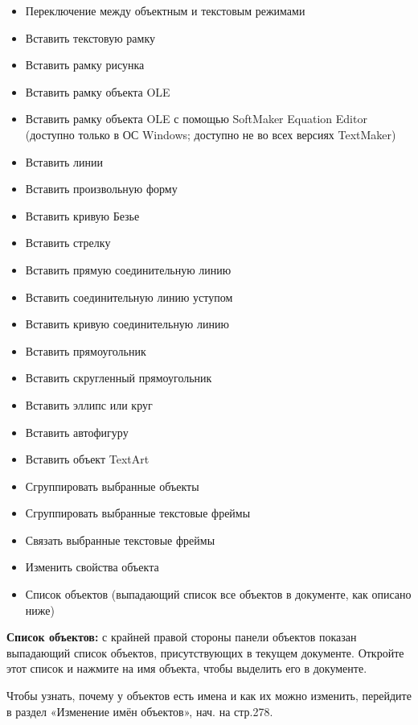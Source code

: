 \documentclass[a4paper,10pt]{article}
\begin{document}
\begin{itemize}
 \item Переключение между объектным и текстовым режимами
 \newline
 \item Вставить текстовую рамку
 \item Вставить рамку рисунка
 \item Вставить рамку объекта OLE
 \item Вставить рамку объекта OLE с помощью SoftMaker Equation Editor (доступно только в ОС Windows; доступно не во всех версиях TextMaker)
 \newline
 \item Вставить линии
 \item Вставить произвольную форму
 \item Вставить кривую Безье
 \item Вставить стрелку
 \item Вставить прямую соединительную линию
 \item Вставить соединительную линию уступом
 \item Вставить кривую соединительную линию
 \item Вставить прямоугольник
 \item Вставить скругленный прямоугольник
 \item Вставить эллипс или круг
 \item Вставить автофигуру
 \item Вставить объект TextArt
 \newline
 \item Сгруппировать выбранные объекты
 \newline
 \item Сгруппировать выбранные текстовые фреймы
 \newline
 \item Связать выбранные текстовые фреймы
 \newline
 \item Изменить свойства объекта
 \item Список объектов (выпадающий список все объектов в документе, как описано ниже)
\end{itemize}

\textbf{Список объектов:} с крайней правой стороны панели объектов показан выпадающий список объектов, присутствующих в текущем документе. Откройте этот список и нажмите на имя объекта, чтобы выделить его в документе.

Чтобы узнать, почему у объектов есть имена и как их можно изменить, перейдите в раздел «Изменение имён объектов», нач. на стр.278.
\end{document}
